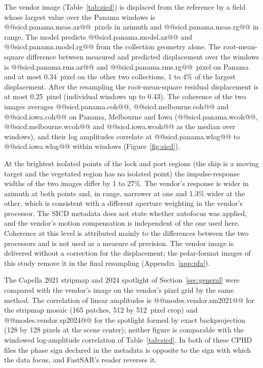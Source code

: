 \documentclass[11pt]{article}
\begin{document}


The vendor image (Table~\ref{tab:sicd}) is displaced from the reference by a field whose largest value over the Panama windows is @@sicd.panama.meas.az@@~pixels in azimuth and @@sicd.panama.meas.rg@@ in range. The model predicts @@sicd.panama.model.az@@ and @@sicd.panama.model.rg@@ from the collection geometry alone. The root-mean-square difference between measured and predicted displacement over the windows is @@sicd.panama.rms.az@@ and @@sicd.panama.rms.rg@@~pixel on Panama and at most 0.34~pixel on the other two collections, 1 to 4\% of the largest displacement. After the resampling the root-mean-square residual displacement is at most 0.25~pixel (individual windows up to 0.43). The coherence of the two images averages @@sicd.panama.coh@@, @@sicd.melbourne.coh@@ and @@sicd.iowa.coh@@ on Panama, Melbourne and Iowa (@@sicd.panama.wcoh@@, @@sicd.melbourne.wcoh@@ and @@sicd.iowa.wcoh@@ as the median over windows), and their log amplitudes correlate at @@sicd.panama.wlog@@ to @@sicd.iowa.wlog@@ within windows (Figure~\ref{fig:sicd}).

At the brightest isolated points of the lock and port regions (the ship is a moving target and the vegetated region has no isolated point) the impulse-response widths of the two images differ by 1 to 27\%. The vendor's response is wider in azimuth at both points and, in range, narrower at one and 1.3\% wider at the other, which is consistent with a different aperture weighting in the vendor's processor. The SICD metadata does not state whether autofocus was applied, and the vendor's motion compensation is independent of the one used here. Coherence at this level is attributed mainly to the differences between the two processors and is not used as a measure of precision. The vendor image is delivered without a correction for the displacement; the polar-format images of this study remove it in the final resampling (Appendix~\ref{app:pfa}).

The Capella 2021 stripmap and 2024 spotlight of Section~\ref{sec:general} were compared with the vendor's image on the vendor's pixel grid by the same method. The correlation of linear amplitudes is @@modes.vendor.sm2021@@ for the stripmap mosaic (165 patches, 512 by 512~pixel crop) and @@modes.vendor.sp2024@@ for the spotlight formed by exact backprojection (128 by 128 pixels at the scene center); neither figure is comparable with the windowed log-amplitude correlation of Table~\ref{tab:sicd}. In both of these CPHD files the phase sign declared in the metadata is opposite to the sign with which the data focus, and FastSAR's reader reverses it.
\end{document}
